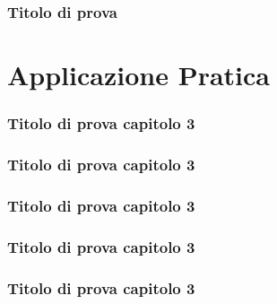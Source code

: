 \documentclass[pdf, aspectratio=169]{beamer}\usepackage[]{graphicx}\usepackage[]{color}
\theoremstyle{definition}
\begin{document}
\begin{frame}
\frametitle{Titolo di prova}

\end{frame}




\section{Applicazione Pratica}

\begin{frame}
\frametitle{Titolo di prova capitolo 3}

\end{frame}



\begin{frame}
\frametitle{Titolo di prova capitolo 3}

\end{frame}


\begin{frame}
\frametitle{Titolo di prova capitolo 3}

\end{frame}


\begin{frame}
\frametitle{Titolo di prova capitolo 3}

\end{frame}


\begin{frame}
\frametitle{Titolo di prova capitolo 3}

\end{frame}
\end{document}
